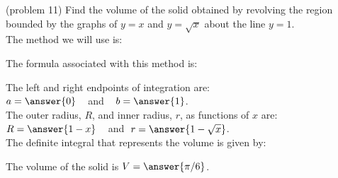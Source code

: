 \documentclass[handout]{ximera}
\begin{document}
\begin{problem}(problem 11)
Find the volume of the solid obtained by revolving the region bounded by the graphs of $y = x$ and $y = \sqrt x$ about the line $y = 1$.\\
The method we will use is:
\begin{multipleChoice}
\end{multipleChoice}

The formula associated with this method is:
\begin{multipleChoice}
\end{multipleChoice}

The left and right endpoints of integration are:\\
$a = \answer{0}\;\;\;$ and $\;\;\; b = \answer{1}$.\\
The outer radius, $R$, and inner radius, $r$, as functions of $x$ are:\\
$R = \answer{1-x} \;\;\;$ and $\; r = \answer{1-\sqrt{x}}$.\\

The definite integral that represents the volume is given by:\\
\begin{multipleChoice}
\end{multipleChoice}

The volume of the solid is $V = \answer{\pi/6}$.

\end{problem}
\end{document}
